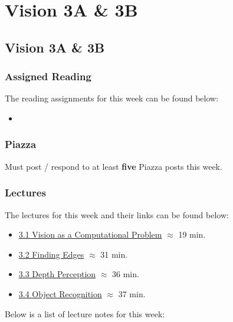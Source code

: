 \clearpage

\renewcommand{\ChapTitle}{Vision 3A \& 3B}
\renewcommand{\SectionTitle}{Vision 3A \& 3B}

\chapter{\ChapTitle}
\section{\SectionTitle}

\subsection{Assigned Reading}

The reading assignments for this week can be found below:

\begin{itemize}
    \item {}
\end{itemize}

\subsection{Piazza}

Must post / respond to at least \textbf{five} Piazza posts this week.

\subsection{Lectures}

The lectures for this week and their links can be found below:

\begin{itemize}
    \item \href{https://www.youtube.com/watch?v=c8yacaB0TEs}{3.1 Vision as a Computational Problem} $\approx$ 19 min.
    \item \href{https://www.youtube.com/watch?v=4-LCyFr6hRQ}{3.2 Finding Edges} $\approx$ 31 min.
    \item \href{https://www.youtube.com/watch?v=_psVot3Y8Lo}{3.3 Depth Perception} $\approx$ 36 min.
    \item \href{https://www.youtube.com/watch?v=OBm_lyWIm9Q}{3.4 Object Recognition} $\approx$ 37 min.
\end{itemize}

\noindent Below is a list of lecture notes for this week:

